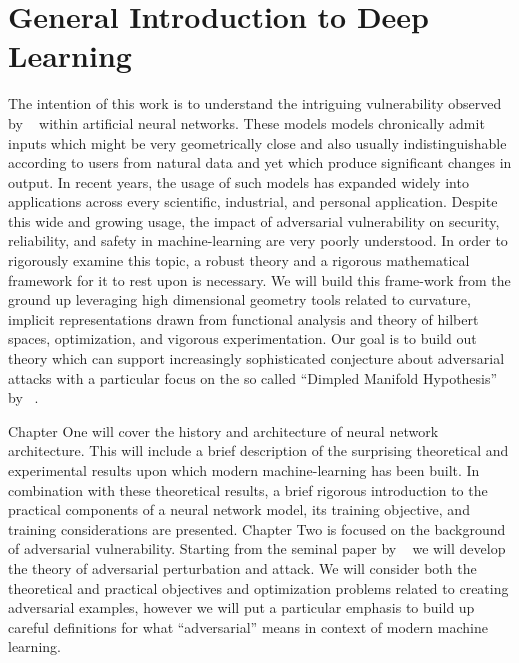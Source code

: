 \chapter{General Introduction to Deep Learning} %
\label{Chapter1} %

The intention of this work is to understand the intriguing vulnerability
observed by ~\citet{szegedy2013} within artificial neural
networks. These models models chronically admit inputs which might be
very geometrically close and also usually indistinguishable according
to users from natural data and yet which produce significant changes
in output. In recent years, the usage of such models has expanded
widely into applications across every scientific, industrial, and
personal application. Despite this wide and growing usage,
the impact of adversarial vulnerability on security, reliability, and
safety in machine-learning are very poorly understood. In order to
rigorously examine this topic, a robust theory and a rigorous
mathematical framework for it to rest upon is necessary. We will build
this frame-work from the ground up leveraging high dimensional
geometry tools related to curvature, implicit representations drawn
from functional analysis and theory of hilbert spaces, optimization,
and vigorous experimentation. Our goal is to build out theory which
can support increasingly sophisticated conjecture about adversarial
attacks with a particular focus on the so called ``Dimpled Manifold
Hypothesis'' by ~\citet{shamir2021dimpled}.

Chapter One will cover the history and architecture of neural network
architecture. This will include a brief description of the surprising
theoretical and experimental results upon which modern
machine-learning has been built. In combination with these theoretical
results, a brief rigorous introduction to the practical components of
a neural network model, its training objective, and training
considerations are presented. Chapter Two is focused on the background
of adversarial vulnerability. Starting from the seminal paper by
~\citet{szegedy2013} we will develop the theory of adversarial
perturbation and attack. We will consider both the theoretical and
practical objectives and optimization problems related to creating
adversarial examples, however we will put a particular emphasis to
build up careful definitions for what ``adversarial'' means in context
of modern machine learning.

